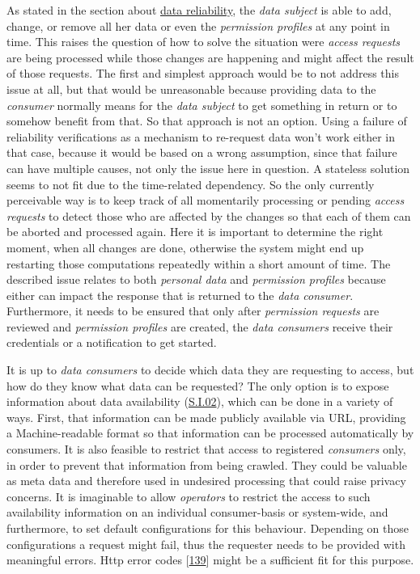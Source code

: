 \documentclass[12pt,english,a4paper,titlepage,cleardoublepage=empty,dottedtoc]{report}
\begin{document}
As stated in the section about \protect\hyperlink{data-reliability}{data
reliability}, the \emph{data subject} is able to add, change, or remove
all her data or even the \emph{permission profiles} at any point in
time. This raises the question of how to solve the situation were
\emph{access requests} are being processed while those changes are
happening and might affect the result of those requests. The first and
simplest approach would be to not address this issue at all, but that
would be unreasonable because providing data to the \emph{consumer}
normally means for the \emph{data subject} to get something in return or
to somehow benefit from that. So that approach is not an option. Using a
failure of reliability verifications as a mechanism to re-request data
won't work either in that case, because it would be based on a wrong
assumption, since that failure can have multiple causes, not only the
issue here in question. A stateless solution seems to not fit due to the
time-related dependency. So the only currently perceivable way is to
keep track of all momentarily processing or pending \emph{access
requests} to detect those who are affected by the changes so that each
of them can be aborted and processed again. Here it is important to
determine the right moment, when all changes are done, otherwise the
system might end up restarting those computations repeatedly within a
short amount of time. The described issue relates to both \emph{personal
data} and \emph{permission profiles} because either can impact the
response that is returned to the \emph{data consumer}. Furthermore, it
needs to be ensured that only after \emph{permission requests} are
reviewed and \emph{permission profiles} are created, the \emph{data
consumers} receive their credentials or a notification to get started.

It is up to \emph{data consumers} to decide which data they are
requesting to access, but how do they know what data can be requested?
The only option is to expose information about data availability
(\protect\hyperlink{si02}{S.I.02}), which can be done in a variety of
ways. First, that information can be made publicly available via URL,
providing a Machine-readable format so that information can be processed
automatically by consumers. It is also feasible to restrict that access
to registered \emph{consumers} only, in order to prevent that
information from being crawled. They could be valuable as meta data and
therefore used in undesired processing that could raise privacy
concerns. It is imaginable to allow \emph{operators} to restrict the
access to such availability information on an individual consumer-basis
or system-wide, and furthermore, to set default configurations for this
behaviour. Depending on those configurations a request might fail, thus
the requester needs to be provided with meaningful errors. Http error
codes {[}\protect\hyperlink{ref-web_spec_http-error-codes}{139}{]} might
be a sufficient fit for this purpose.
\end{document}
